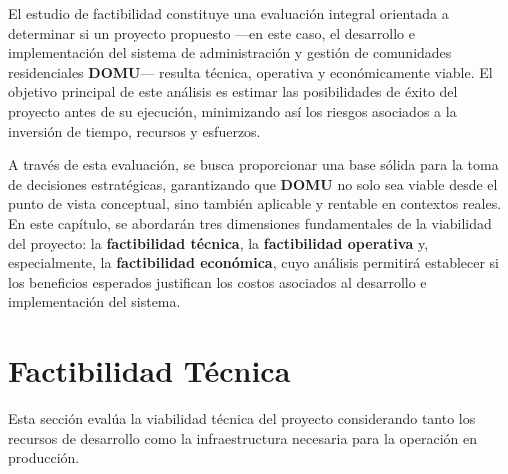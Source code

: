 El estudio de factibilidad constituye una evaluación integral orientada a determinar si un proyecto propuesto —en este caso, el desarrollo e implementación del sistema de administración y gestión de comunidades residenciales \textbf{DOMU}— resulta técnica, operativa y económicamente viable. El objetivo principal de este análisis es estimar las posibilidades de éxito del proyecto antes de su ejecución, minimizando así los riesgos asociados a la inversión de tiempo, recursos y esfuerzos.

A través de esta evaluación, se busca proporcionar una base sólida para la toma de decisiones estratégicas, garantizando que \textbf{DOMU} no solo sea viable desde el punto de vista conceptual, sino también aplicable y rentable en contextos reales. En este capítulo, se abordarán tres dimensiones fundamentales de la viabilidad del proyecto: la \textbf{factibilidad técnica}, la \textbf{factibilidad operativa} y, especialmente, la \textbf{factibilidad económica}, cuyo análisis permitirá establecer si los beneficios esperados justifican los costos asociados al desarrollo e implementación del sistema.

\section{Factibilidad Técnica}
Esta sección evalúa la viabilidad técnica del proyecto considerando tanto los recursos de desarrollo como la infraestructura necesaria para la operación en producción.

